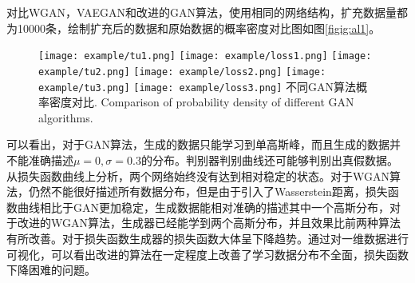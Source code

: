对比WGAN，VAEGAN和改进的GAN算法，使用相同的网络结构，扩充数据量都为10000条，绘制扩充后的数据和原始数据的概率密度对比图如图\ref{figig:al1}。


\begin{figure}[htpb]
	\centering
	{\texttt{[image: example/tu1.png]}}
	\hspace{0.5em}
	{\texttt{[image: example/loss1.png]}}
	\newline
	\centering
	{\texttt{[image: example/tu2.png]}}
	\hspace{0.5em}
	{\texttt{[image: example/loss2.png]}}
	\newline
	\centering
	{\texttt{[image: example/tu3.png]}}
	\hspace{0.5em}
	{\texttt{[image: example/loss3.png]}}
	\bicaption
	{不同GAN算法概率密度对比.}
	{Comparison of probability density of different GAN algorithms.}
	\label{fig:shiyan}
\end{figure}



可以看出，对于GAN算法，生成的数据只能学习到单高斯峰，而且生成的数据并不能准确描述$\mu=0,\sigma=0.3$的分布。判别器判别曲线还可能够判别出真假数据。从损失函数曲线上分析，两个网络始终没有达到相对稳定的状态。对于WGAN算法，仍然不能很好描述所有数据分布，但是由于引入了Wasserstein距离，损失函数曲线相比于GAN更加稳定，生成数据能相对准确的描述其中一个高斯分布，对于改进的WGAN算法，生成器已经能学到两个高斯分布，并且效果比前两种算法有所改善。对于损失函数生成器的损失函数大体呈下降趋势。通过对一维数据进行可视化，可以看出改进的算法在一定程度上改善了学习数据分布不全面，损失函数下降困难的问题。
